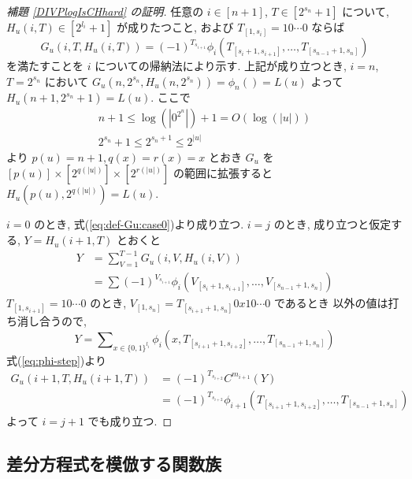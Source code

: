 \begin{proof}[\rm 補題 \ref{DIVPlogIsCHhard} の証明]
 任意の $i \in [n+1]$, $T \in [2^{s_n}+1]$ について,
 $H_u(i,T) \in [2^{l_i}+1]$ が成りたつこと,
 および $T_{[1,s_i]} = 10 \cdots 0$ ならば
 \begin{equation} \label{eq:subformula}
  G_u(i,T,H_u(i,T)) = (-1)^{T_{s_{i+1}}} 
   \phi_i(T_{[s_i+1, s_{i+1}]}, \dots, T_{[s_{n-1}+1, s_n]})
 \end{equation}
 を満たすことを $i$ についての帰納法により示す.
 上記が成り立つとき,
 $i=n$, $T=2^{s_n}$ において $G_u(n, 2^{s_n}, H_u(n,2^{s_n})) = \phi_n() = L(u)$
 よって $H_u(n+1, 2^{s_n}+1) = L(u)$.
 ここで 
 \begin{gather}
  n+1 \le \log(|0^{2^n}|) + 1 = O(\log(|u|)) \\
  2^{s_n}+1 \le 2^{s_n+1} \le 2^{|u|}
 \end{gather}
 より $p(u) = n+1, q(x) = r(x) = x$ とおき $G_u$ を
 $[p(u)] \times [2^{q(|u|)}] \times [2^{r(|u|)}]$ の範囲に拡張すると
 $H_u(p(u), 2^{q(|u|)}) = L(u)$.

 $i=0$ のとき, 式(\ref{eq:def-Gu:case0})より成り立つ.
 $i=j$ のとき, 成り立つと仮定する, $Y = H_u(i+1, T)$ とおくと
 \begin{align}
  Y 
  &= \sum_{V = 1}^{T-1} G_u(i, V, H_u(i, V)) \\
  &= \sum (-1)^{V_{s_{i+1}}} \phi_i(V_{[s_i+1, s_{i+1}]}, 
   \dots, V_{[s_{n-1}+1, s_n]})
 \end{align}
 $T_{[1, s_{i+1}]} = 10 \cdots 0$ のとき,
 $V_{[1, s_n]} = T_{[s_{i+1}+1,s_n]} 0 x 1 0 \cdots 0$ であるとき
 以外の値は打ち消し合うので,
 \begin{equation}
  Y = \sum\nolimits_{x \in \{0,1\}^{l_i}} 
  \phi_i(x, T_{[s_{i+1}+1, s_{i+2}]}, \dots, T_{[s_{n-1}+1, s_n]})
 \end{equation}
 式(\ref{eq:phi-step})より
 \begin{align}
  G_u(i+1,T,H_u(i+1,T)) 
  &= (-1)^{T_{s_{i+2}}} C^{m_{i+1}} (Y)\\
  &= (-1)^{T_{s_{i+2}}} \phi_{i+1}(T_{[s_{i+1}+1, s_{i+2}]}, \dots, T_{[s_{n-1}+1, s_n]})
 \end{align}
 よって $i=j+1$ でも成り立つ.
 \end{proof}



\subsection{差分方程式を模倣する関数族}


